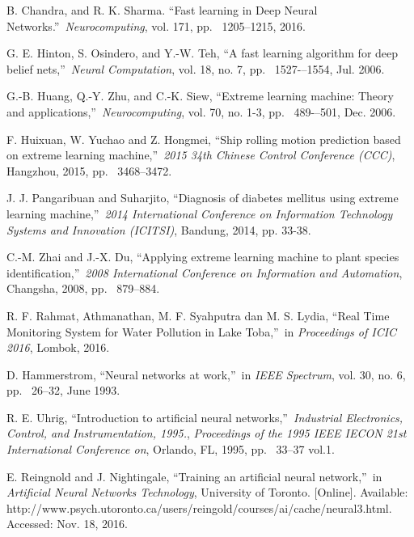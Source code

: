 \documentclass{ws-ijait}
\begin{document}
\begin{thebibliography}{00}
 B. Chandra, and R. K. Sharma. \textquotedblleft Fast learning in Deep Neural Networks.\textquotedblright \ {\it Neurocomputing}, vol. 171, pp. ~1205--1215, 2016.

 G. E. Hinton, S. Osindero, and Y.-W. Teh, \textquotedblleft A fast learning algorithm for deep belief nets,\textquotedblright \ {\it Neural Computation}, vol. 18, no. 7, pp. ~1527-–1554, Jul. 2006.

 G.-B. Huang, Q.-Y. Zhu, and C.-K. Siew, \textquotedblleft Extreme learning machine: Theory and applications,\textquotedblright \ {\it Neurocomputing}, vol. 70, no. 1-3, pp. ~489-–501, Dec. 2006.

 F. Huixuan, W. Yuchao and Z. Hongmei, \textquotedblleft Ship rolling motion prediction based on extreme learning machine,\textquotedblright \ {\it2015 34th Chinese Control Conference (CCC)}, Hangzhou, 2015, pp. ~3468--3472.

 J. J. Pangaribuan and Suharjito, \textquotedblleft Diagnosis of diabetes mellitus using extreme learning machine,\textquotedblright \ {\it 2014 International Conference on Information Technology Systems and Innovation (ICITSI)}, Bandung, 2014, pp. 33-38.

 C.-M. Zhai and J.-X. Du, \textquotedblleft Applying extreme learning machine to plant species identification,\textquotedblright \ {\it 2008 International Conference on Information and Automation}, Changsha, 2008, pp. ~879--884.

 R. F. Rahmat, Athmanathan, M. F. Syahputra dan M. S. Lydia, \textquotedblleft Real Time Monitoring System for Water Pollution in Lake Toba,\textquotedblright \ in {\it Proceedings of ICIC 2016}, Lombok, 2016.

 D. Hammerstrom, \textquotedblleft Neural networks at work,\textquotedblright \ in {\it IEEE Spectrum}, vol. 30, no. 6, pp. ~26--32, June 1993.

 R. E. Uhrig, \textquotedblleft Introduction to artificial neural networks,\textquotedblright \ {\it Industrial Electronics, Control, and Instrumentation, 1995.}, {\it Proceedings of the 1995 IEEE IECON 21st International Conference on}, Orlando, FL, 1995, pp. ~33--37 vol.1.

 E. Reingnold and J. Nightingale, \textquotedblleft Training an artificial neural network,\textquotedblright \ in {\it Artificial Neural Networks Technology}, University of Toronto. [Online]. Available: http://www.psych.utoronto.ca/users/reingold/courses/ai/cache/neural3.html. Accessed: Nov. 18, 2016.


\end{thebibliography}
\end{document}

